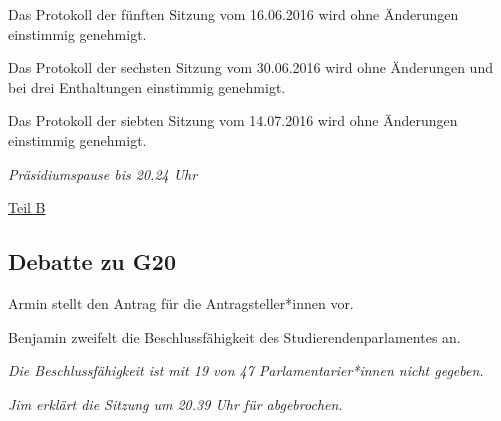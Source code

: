 \documentclass[ngerman,headheight=70pt]{scrartcl}
\begin{document}
    Das Protokoll der fünften Sitzung vom 16.06.2016 wird ohne Änderungen
    einstimmig genehmigt.

    Das Protokoll der sechsten Sitzung vom 30.06.2016 wird ohne Änderungen und
    bei drei Enthaltungen einstimmig genehmigt.

    Das Protokoll der siebten Sitzung vom 14.07.2016 wird ohne Änderungen
    einstimmig genehmigt.

    \textit{Präsidiumspause bis 20.24 Uhr}

    \vspace{0.5cm}
    {\Large \underline{Teil B}}

    \subsection{Debatte zu G20}

    Armin stellt den Antrag für die Antragsteller*innen vor.

    Benjamin zweifelt die Beschlussfähigkeit des Studierendenparlamentes an.

    \textit{Die Beschlussfähigkeit ist mit 19 von 47 Parlamentarier*innen nicht
    gegeben.}

    \textit{Jim erklärt die Sitzung um 20.39 Uhr für abgebrochen.}
\end{document}
